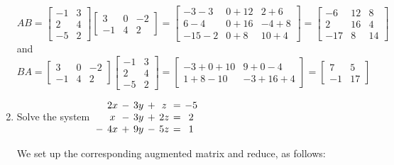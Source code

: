 \documentclass[12pt]{article}
\newcommand{\points}[1]{\marginpar{\hspace{24pt}[#1]}}
\begin{document}
\begin{enumerate}
\[
 AB = \begin{bmatrix}-1&3\\2&4\\-5&2\end{bmatrix}\begin{bmatrix}3&0&-2\\-1&4&2\end{bmatrix} = \begin{bmatrix}-3-3&0+12&2+6\\6-4&0+16&-4+8\\-15-2&0+8&10+4\end{bmatrix} = \begin{bmatrix}-6&12&8\\2&16&4\\-17&8&14\end{bmatrix}
\]
and
\[
 BA = \begin{bmatrix}3&0&-2\\-1&4&2\end{bmatrix}\begin{bmatrix}-1&3\\2&4\\-5&2\end{bmatrix} = \begin{bmatrix}-3+0+10&9+0-4\\1+8-10&-3+16+4\end{bmatrix} = \begin{bmatrix}7&5\\-1&17\end{bmatrix}
\]

\pagebreak

\item Solve the system \hspace{12pt} $\arraycolsep=2pt \begin{array}{cccccccc}&2x&-&3y&+&z&=&-5\\
 &x&-&3y&+&2z&=&2\\
-&4x&+&9y&-&5z&=&1\end{array}$ \points{8}

\bigskip

We set up the corresponding augmented matrix and reduce, as follows:


\end{enumerate}
\end{document}

